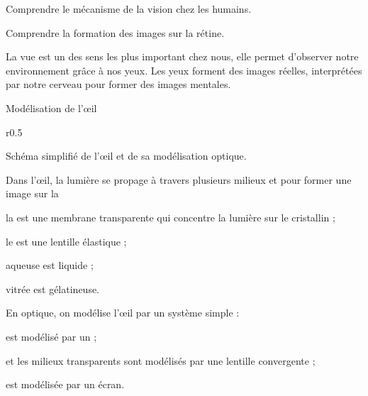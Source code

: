 \tetePremStssVisi
{}

\begin{objectifs}
  \item Comprendre le mécanisme de la vision chez les humains.
  \item Comprendre la formation des images sur la rétine.
\end{objectifs}

\begin{contexte}
  La vue est un des sens les plus important chez nous, elle permet d'observer notre environnement grâce à nos yeux.
  Les yeux forment des images réelles, interprétées par notre cerveau pour former des images mentales.
  
\end{contexte}

\begin{doc}{Modélisation de l’œil}
  \begin{wrapfigure}{r}{0.5\linewidth}
    \vspace*{-30pt}
    \centering

    \vspace*{-12pt}
    \small{Schéma simplifié de l’œil et de sa modélisation optique.}
  \end{wrapfigure}

  Dans l’œil, la lumière se propage à travers plusieurs milieux  et  pour former une image sur la 
  \begin{listePoints}
    \item la  est une membrane transparente qui concentre la lumière sur le cristallin ;
    \item le  est une lentille élastique ;
    \item {} aqueuse est liquide ;
    \item {} vitrée est gélatineuse.
  \end{listePoints}

  En optique, on modélise l’œil par un système simple :
  \begin{listePoints}
    \item {} est modélisé par un  ;
    \item {} et les milieux transparents sont modélisés par une lentille convergente ;
    \item {} est modélisée par un écran.
  \end{listePoints}
\end{doc}

